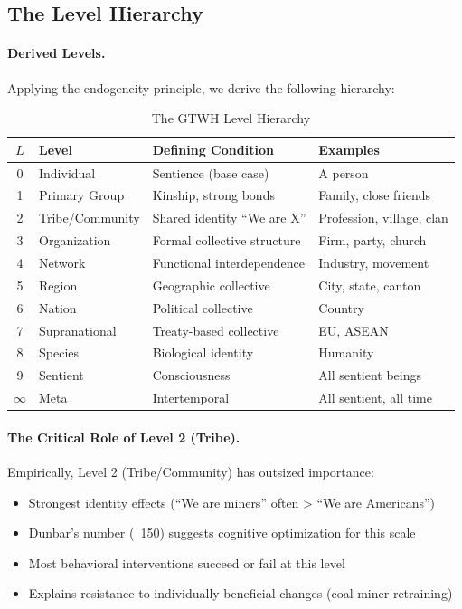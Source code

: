 \subsection{The Level Hierarchy}

\paragraph{Derived Levels.}
Applying the endogeneity principle, we derive the following hierarchy:

\begin{table}[htbp]
\centering
\caption{The GTWH Level Hierarchy}
\label{tab:gtwh-hierarchy}
\renewcommand{\arraystretch}{1.4}
\begin{tabular}{@{}clll@{}}
\toprule
$L$ & \textbf{Level} & \textbf{Defining Condition} & \textbf{Examples} \\
\midrule
0 & Individual & Sentience (base case) & A person \\
1 & Primary Group & Kinship, strong bonds & Family, close friends \\
2 & Tribe/Community & Shared identity ``We are X'' & Profession, village, clan \\
3 & Organization & Formal collective structure & Firm, party, church \\
4 & Network & Functional interdependence & Industry, movement \\
5 & Region & Geographic collective & City, state, canton \\
6 & Nation & Political collective & Country \\
7 & Supranational & Treaty-based collective & EU, ASEAN \\
8 & Species & Biological identity & Humanity \\
9 & Sentient & Consciousness & All sentient beings \\
$\infty$ & Meta & Intertemporal & All sentient, all time \\
\bottomrule
\end{tabular}
\end{table}

\paragraph{The Critical Role of Level 2 (Tribe).}
Empirically, Level 2 (Tribe/Community) has outsized importance:
\begin{itemize}
\item Strongest identity effects (``We are miners'' often > ``We are Americans'')
\item Dunbar's number (~150) suggests cognitive optimization for this scale
\item Most behavioral interventions succeed or fail at this level
\item Explains resistance to individually beneficial changes (coal miner retraining)
\end{itemize}

